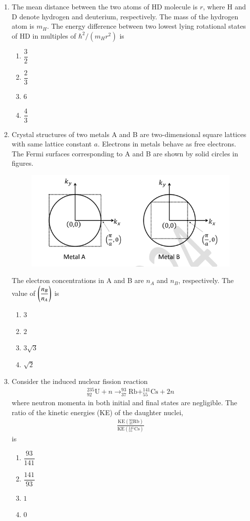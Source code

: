 \documentclass[journal,12pt,onecolumn]{IEEEtran}
\theoremstyle{remark}
\begin{document}
\begin{enumerate}
\item The mean distance between the two atoms of HD molecule is $r$, where H and D denote hydrogen and deuterium, respectively. The mass of the hydrogen atom is $m_H$. The energy difference between two lowest lying rotational states of HD in multiples of $\hbar^2/(m_H r^2)$ is
\begin{enumerate}
    \item $\dfrac{3}{2}$
    \item $\dfrac{2}{3}$
    \item $6$
    \item $\dfrac{4}{3}$
\end{enumerate}

\item Crystal structures of two metals A and B are two-dimensional square lattices with same lattice constant $a$. Electrons in metals behave as free electrons. The Fermi surfaces corresponding to A and B are shown by solid circles in figures.
\begin{figure}[H]
    \centering
    \includegraphics[width = 0.7\columnwidth]{fig/Q16.png}
    \caption*{}
    \label{fig:Q16}
\end{figure}
The electron concentrations in A and B are $n_A$ and $n_B$, respectively. The value of $\left(\dfrac{n_B}{n_A}\right)$ is
\begin{enumerate}
    \item $3$
    \item $2$
    \item $3\sqrt{3}$
    \item $\sqrt{2}$
\end{enumerate}
\item Consider the induced nuclear fission reaction
\begin{align}
^{235}_{92}\mathrm{U} + n \rightarrow ^{93}_{37}\mathrm{Rb} + ^{141}_{55}\mathrm{Cs} + 2n
\end{align}
where neutron momenta in both initial and final states are negligible. The ratio of the kinetic energies (KE) of the daughter nuclei,
\begin{align}
\frac{\mathrm{KE} {(^{93}_{37}\mathrm{Rb})}}{\mathrm{KE}(^{141}_{55}\mathrm{Cs})} 
\end{align}
is \underline{\hspace{2cm}}
\begin{enumerate}
    \item $\dfrac{93}{141}$
    \item $\dfrac{141}{93}$
    \item $1$
    \item $0$
\end{enumerate}


\end{enumerate}
\end{document}
